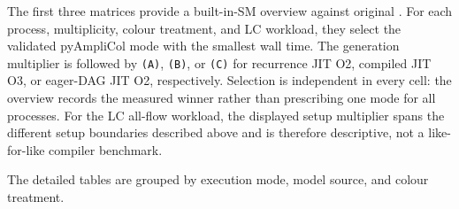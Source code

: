 The first three matrices provide a built-in-SM overview against original
\AC{}.  For each process, multiplicity, colour treatment, and LC workload,
they select the validated pyAmpliCol mode with the smallest wall time.  The
generation multiplier is followed by \texttt{(A)}, \texttt{(B)}, or
\texttt{(C)} for recurrence JIT O2, compiled JIT O3, or eager-DAG JIT O2,
respectively.  Selection is independent in every cell: the overview records
the measured winner rather than prescribing one mode for all processes.
For the LC all-flow workload, the displayed setup multiplier spans the
different setup boundaries described above and is therefore descriptive, not
a like-for-like compiler benchmark.





The detailed tables are grouped by execution mode, model source, and colour
treatment.













